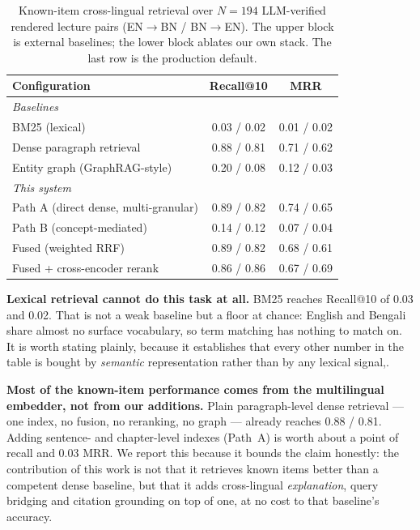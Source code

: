 \documentclass[11pt,a4paper]{article}
\begin{document}
\begin{table}[t]
\centering
\caption{Known-item cross-lingual retrieval over $N=194$ LLM-verified
rendered lecture pairs (EN$\to$BN / BN$\to$EN). The upper block is external
baselines; the lower block ablates our own stack. The last row is the
production default.}
\label{tab:knownitem}
\begin{tabular}{lcc}
\toprule
Configuration & Recall@10 & MRR\\
\midrule
\multicolumn{3}{l}{\emph{Baselines}}\\
BM25 (lexical)                     & 0.03 / 0.02 & 0.01 / 0.02\\
Dense paragraph retrieval          & 0.88 / 0.81 & 0.71 / 0.62\\
Entity graph (GraphRAG-style)      & 0.20 / 0.08 & 0.12 / 0.03\\
\midrule
\multicolumn{3}{l}{\emph{This system}}\\
Path A (direct dense, multi-granular) & 0.89 / 0.82 & 0.74 / 0.65\\
Path B (concept-mediated)          & 0.14 / 0.12 & 0.07 / 0.04\\
Fused (weighted RRF)               & 0.89 / 0.82 & 0.68 / 0.61\\
Fused + cross-encoder rerank       & 0.86 / 0.86 & 0.67 / 0.69\\
\bottomrule
\end{tabular}
\end{table}

\textbf{Lexical retrieval cannot do this task at all.} BM25 reaches
Recall@10 of 0.03 and 0.02. That is not a weak baseline but a floor at
chance: English and Bengali share almost no surface vocabulary, so term
matching has nothing to match on. It is worth stating plainly, because it
establishes that every other number in the table is bought by
\emph{semantic} representation rather than by any lexical signal,.

\textbf{Most of the known-item performance comes from the multilingual
embedder, not from our additions.} Plain paragraph-level dense retrieval ---
one index, no fusion, no reranking, no graph --- already reaches 0.88 / 0.81.
Adding sentence- and chapter-level indexes (Path~A) is worth about a point
of recall and 0.03 MRR. We report this because it bounds the claim honestly:
the contribution of this work is not that it retrieves known items better
than a competent dense baseline, but that it adds cross-lingual
\emph{explanation}, query bridging and citation grounding on top of one, at
no cost to that baseline's accuracy.
\end{document}
